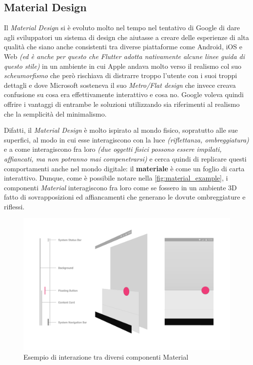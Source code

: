 \subsection{Material Design}
Il \textit{Material Design} si è evoluto molto nel tempo nel tentativo di Google di dare agli sviluppatori un sistema di design che aiutasse a creare delle esperienze di alta qualità che siano anche consistenti tra diverse piattaforme come Android, iOS e Web \textit{(ed è anche per questo che Flutter adotta nativamente alcune linee guida di questo stile)} in un ambiente in cui Apple andava molto verso il realismo col suo \textit{scheumorfismo} che però rischiava di distrarre troppo l'utente con i suoi troppi dettagli e dove Microsoft sosteneva il suo \textit{Metro/Flat design} che invece creava confusione su cosa era effettivamente interattivo e cosa no. Google voleva quindi offrire i vantaggi di entrambe le soluzioni utilizzando sia riferimenti al realismo che la semplicità del minimalismo.

\newpage

Difatti, il \textit{Material Design} è molto ispirato al mondo fisico, sopratutto alle sue superfici, al modo in cui esse interagiscono con la luce \textit{(riflettanza, ombreggiatura)} e a come interagiscono fra loro \textit{(due oggetti fisici possono essere impilati, affiancati, ma non potranno mai compenetrarsi)} e cerca quindi di replicare questi comportamenti anche nel mondo digitale: il \textbf{materiale} è come un foglio di carta interattivo.
Dunque, come è possibile notare nella \autoref{fig:material_example}, i componenti \textit{Material} interagiscono fra loro come se fossero in un ambiente 3D fatto di sovrapposizioni ed affiancamenti che generano le dovute ombreggiature e riflessi.

\begin{figure}[h]
\centering
\includegraphics[width=1\textwidth]{img/material_example}
\caption{Esempio di interazione tra diversi componenti Material}
\label{fig:material_example}
\end{figure}


